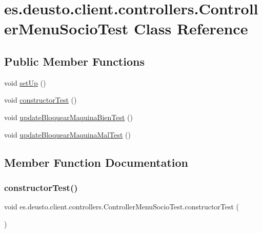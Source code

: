 \hypertarget{classes_1_1deusto_1_1client_1_1controllers_1_1_controller_menu_socio_test}{}\section{es.\+deusto.\+client.\+controllers.\+Controller\+Menu\+Socio\+Test Class Reference}
\label{classes_1_1deusto_1_1client_1_1controllers_1_1_controller_menu_socio_test}
\subsection*{Public Member Functions}
\begin{DoxyCompactItemize}
\item 
void \mbox{\hyperlink{classes_1_1deusto_1_1client_1_1controllers_1_1_controller_menu_socio_test_ae7e0ec319ab3af52c29726b53f169570}{set\+Up}} ()
\item 
void \mbox{\hyperlink{classes_1_1deusto_1_1client_1_1controllers_1_1_controller_menu_socio_test_a88db1a7caae22c9adb1c98d9c97d7a70}{constructor\+Test}} ()
\item 
void \mbox{\hyperlink{classes_1_1deusto_1_1client_1_1controllers_1_1_controller_menu_socio_test_ab059ceb5ac159bb3de7fcba8d6104db2}{update\+Bloquear\+Maquina\+Bien\+Test}} ()
\item 
void \mbox{\hyperlink{classes_1_1deusto_1_1client_1_1controllers_1_1_controller_menu_socio_test_a071ae2ba10470efe6b07411ecaf28b39}{update\+Bloquear\+Maquina\+Mal\+Test}} ()
\end{DoxyCompactItemize}


\subsection{Member Function Documentation}
\mbox{\label{classes_1_1deusto_1_1client_1_1controllers_1_1_controller_menu_socio_test_a88db1a7caae22c9adb1c98d9c97d7a70}} 
\subsubsection{\texorpdfstring{constructorTest()}{constructorTest()}}
{\footnotesize\ttfamily void es.\+deusto.\+client.\+controllers.\+Controller\+Menu\+Socio\+Test.\+constructor\+Test (\begin{DoxyParamCaption}{ }\end{DoxyParamCaption})}

